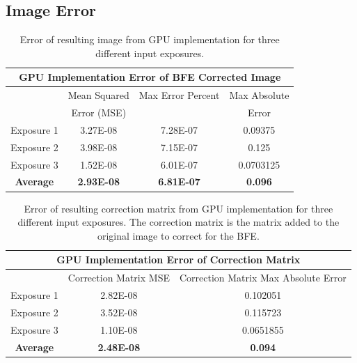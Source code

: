 \documentclass[DM,authoryear,toc]{lsstdoc}
\begin{document}
\FloatBarrier

\clearpage

\subsection{Image Error}

\begin{table}[h]
\begin{center}
\begin{tabular}{|c|c|c|c|}
\multicolumn{4}{c}{\textbf{GPU Implementation Error of BFE Corrected Image}}\\
\hline
 & Mean Squared & Max Error Percent & Max Absolute\\
 & Error (MSE) & & Error\\
\hline
Exposure 1 & 3.27E-08 & 7.28E-07 & 0.09375\\
\hline
Exposure 2 & 3.98E-08 & 7.15E-07 & 0.125\\
\hline
Exposure 3 & 1.52E-08 & 6.01E-07 & 0.0703125\\
\hline
\textbf{Average} & \textbf{2.93E-08} & \textbf{6.81E-07} & \textbf{0.096}\\
\hline
\end{tabular}
\caption{\label{tab:gpuerrcorrimg}Error of resulting image from GPU implementation for three different input exposures.}
\end{center}
\end{table}


\begin{table}[h]
\begin{center}
\begin{tabular}{|c|c|c|}
\multicolumn{3}{c}{\textbf{GPU Implementation Error of Correction Matrix}}\\
\hline
 & Correction Matrix MSE & Correction Matrix Max Absolute Error\\
\hline
Exposure 1 & 2.82E-08 & 0.102051\\
\hline
Exposure 2 & 3.52E-08 & 0.115723\\
\hline
Exposure 3 & 1.10E-08 & 0.0651855\\
\hline
\textbf{Average} & \textbf{2.48E-08} & \textbf{0.094}\\
\hline
\end{tabular}
\caption{\label{tab:gpuerrcorrmat}Error of resulting correction matrix from GPU implementation for three different input exposures. The correction matrix is the matrix added to the original image to correct for the BFE.}
\end{center}
\end{table}
\end{document}

